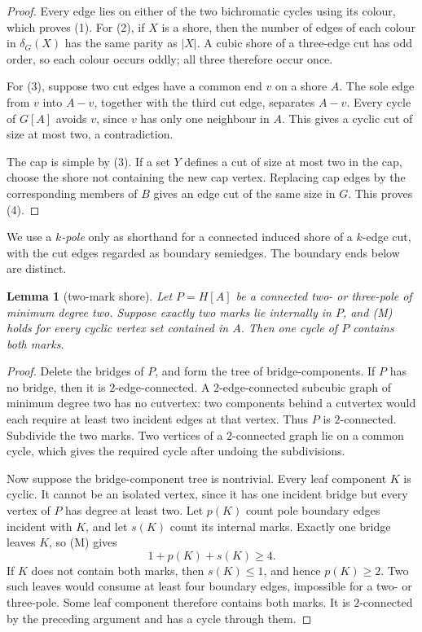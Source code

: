 \documentclass[11pt]{article}
\newtheorem{lemma}[theorem]{Lemma}
\theoremstyle{definition}
\theoremstyle{remark}
\newcommand{\cut}{\delta}
\begin{document}
\begin{proof}
Every edge lies on either of the two bichromatic cycles using its colour,
which proves (1).  For (2), if \(X\) is a shore, then the number of
edges of each colour in \(\cut_G(X)\) has the same parity as \(|X|\).
A cubic shore of a three-edge cut has odd order, so each colour occurs
oddly; all three therefore occur once.

For (3), suppose two cut edges have a common end \(v\) on a shore \(A\).
The sole edge from \(v\) into \(A-v\), together with the third cut edge,
separates \(A-v\).  Every cycle of \(G[A]\) avoids \(v\), since \(v\)
has only one neighbour in \(A\).  This gives a cyclic cut of size at
most two, a contradiction.

The cap is simple by (3).  If a set \(Y\) defines a cut of size at most
two in the cap, choose the shore not containing the new cap vertex.
Replacing cap edges by the corresponding members of \(B\) gives an
edge cut of the same size in \(G\).  This proves (4).
\end{proof}

We use a \emph{\(k\)-pole} only as shorthand for a connected induced
shore of a \(k\)-edge cut, with the cut edges regarded as boundary
semiedges.  The boundary ends below are distinct.

\begin{lemma}[two-mark shore]\label{lem:twomark}
Let \(P=H[A]\) be a connected two- or three-pole of minimum degree two.
Suppose exactly two marks lie internally in \(P\), and (M) holds for
every cyclic vertex set contained in \(A\).  Then one cycle of \(P\)
contains both marks.
\end{lemma}

\begin{proof}
Delete the bridges of \(P\), and form the tree of bridge-components.
If \(P\) has no bridge, then it is \(2\)-edge-connected.  A
\(2\)-edge-connected subcubic graph of minimum degree two has no
cutvertex: two components behind a cutvertex would each require at
least two incident edges at that vertex.  Thus \(P\) is
\(2\)-connected.  Subdivide the two marks.  Two vertices of a
\(2\)-connected graph lie on a common cycle, which gives the required
cycle after undoing the subdivisions.

Now suppose the bridge-component tree is nontrivial.  Every leaf
component \(K\) is cyclic.  It cannot be an isolated vertex, since it
has one incident bridge but every vertex of \(P\) has degree at least
two.  Let \(p(K)\) count pole boundary edges incident with \(K\), and
let \(s(K)\) count its internal marks.  Exactly one bridge leaves \(K\),
so (M) gives
\[
 1+p(K)+s(K)\ge4.
\]
If \(K\) does not contain both marks, then \(s(K)\le1\), and hence
\(p(K)\ge2\).  Two such leaves would consume at least four boundary
edges, impossible for a two- or three-pole.  Some leaf component
therefore contains both marks.  It is \(2\)-connected by the preceding
argument and has a cycle through them.
\end{proof}
\end{document}
